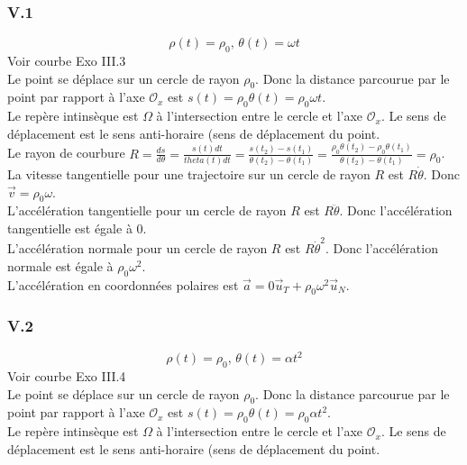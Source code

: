 \documentclass[]{book}
\theoremstyle{definition}
\begin{document}
\subsubsection*{V.1}
$$\rho(t) = \rho_{0},\, \theta(t)=\omega t $$
Voir courbe Exo III.3\\

Le point se d\'eplace sur un cercle de rayon $\rho_{0}$. Donc la distance parcourue par le point par rapport \`a l'axe $\mathcal{O}_x$ est $s(t) = \rho_{0}\theta(t) = \rho_{0}\omega t$.\\

Le rep\`ere intins\`eque est $\Omega$ \`a l'intersection entre le cercle et l'axe $\mathcal{O}_x$. Le sens de d\'eplacement est le sens anti-horaire (sens de d\'eplacement du point.\\

Le rayon de courbure $R = \frac{ds}{d\theta} = \frac{s(t)dt}{theta(t)dt} = \frac{s(t_2)-s(t_1)}{\theta(t_2)-\theta(t_1)} = \frac{\rho_0\theta(t_2)-\rho_0\theta(t_1)}{\theta(t_2)-\theta(t_1)} = \rho_{0}$.\\

La vitesse tangentielle pour une trajectoire sur un cercle de rayon $R$ est $R\dot{\theta}$. Donc $\vec{v}=\rho_0\omega$.\\

L'acc\'el\'eration tangentielle pour un cercle de rayon $R$ est $R\ddot{\theta}$. Donc l'acc\'el\'eration tangentielle est \'egale \`a $0$.\\

L'acc\'el\'eration normale pour un cercle de rayon $R$ est $R\dot{\theta}^2$. Donc l'acc\'el\'eration normale est \'egale \`a $\rho_{0}\omega^2$.\\

L'acc\'el\'eration en coordonn\'ees polaires est $\vec{a} = 0\vec{u}_{T} +  \rho_{0}\omega^2\vec{u}_{N}$.

\subsubsection*{V.2}
$$\rho(t) = \rho_{0},\, \theta(t)=\alpha t^2 $$
Voir courbe Exo III.4\\

Le point se d\'eplace sur un cercle de rayon $\rho_{0}$. Donc la distance parcourue par le point par rapport \`a l'axe $\mathcal{O}_x$ est $s(t) = \rho_{0}\theta(t) = \rho_{0}\alpha t^2$.\\

Le rep\`ere intins\`eque est $\Omega$ \`a l'intersection entre le cercle et l'axe $\mathcal{O}_x$. Le sens de d\'eplacement est le sens anti-horaire (sens de d\'eplacement du point.\\
\end{document}
